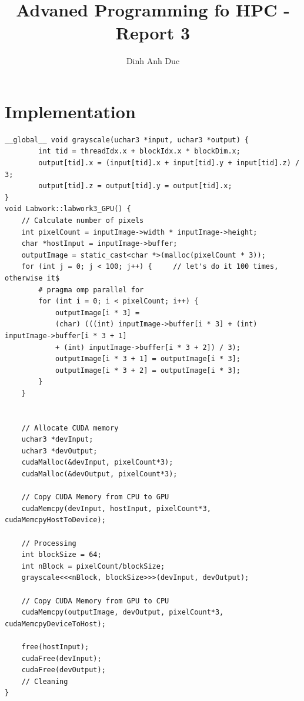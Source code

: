\documentclass{article}
\title{Advaned Programming fo HPC - Report 3}
\author{Dinh Anh Duc}
\begin{document}
\maketitle

\section*{Implementation}
\begin{lstlisting}
__global__ void grayscale(uchar3 *input, uchar3 *output) {
        int tid = threadIdx.x + blockIdx.x * blockDim.x;
        output[tid].x = (input[tid].x + input[tid].y + input[tid].z) / 3;
        output[tid].z = output[tid].y = output[tid].x;
}
void Labwork::labwork3_GPU() {
    // Calculate number of pixels
    int pixelCount = inputImage->width * inputImage->height;
    char *hostInput = inputImage->buffer;
    outputImage = static_cast<char *>(malloc(pixelCount * 3));
    for (int j = 0; j < 100; j++) {     // let's do it 100 times, otherwise it$
        # pragma omp parallel for
        for (int i = 0; i < pixelCount; i++) {
            outputImage[i * 3] = 
            (char) (((int) inputImage->buffer[i * 3] + (int) inputImage->buffer[i * 3 + 1] 
            + (int) inputImage->buffer[i * 3 + 2]) / 3);
            outputImage[i * 3 + 1] = outputImage[i * 3];
            outputImage[i * 3 + 2] = outputImage[i * 3];
        }
    }


    // Allocate CUDA memory
    uchar3 *devInput;
    uchar3 *devOutput;
    cudaMalloc(&devInput, pixelCount*3);
    cudaMalloc(&devOutput, pixelCount*3);

    // Copy CUDA Memory from CPU to GPU
    cudaMemcpy(devInput, hostInput, pixelCount*3, cudaMemcpyHostToDevice);

    // Processing
    int blockSize = 64;
    int nBlock = pixelCount/blockSize;
    grayscale<<<nBlock, blockSize>>>(devInput, devOutput);

    // Copy CUDA Memory from GPU to CPU
    cudaMemcpy(outputImage, devOutput, pixelCount*3, cudaMemcpyDeviceToHost);

    free(hostInput);
    cudaFree(devInput);
    cudaFree(devOutput);
    // Cleaning
}

\end{lstlisting}
\end{document}
